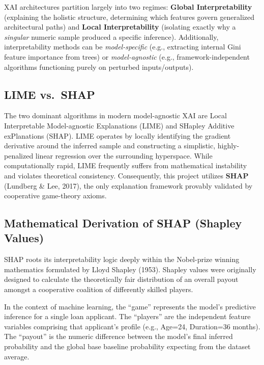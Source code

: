 XAI architectures partition largely into two regimes: \textbf{Global
Interpretability} (explaining the holistic structure, determining which
features govern generalized architectural paths) and \textbf{Local
Interpretability} (isolating exactly why a \emph{singular} numeric
sample produced a specific inference). Additionally, interpretability
methods can be \emph{model-specific} (e.g., extracting internal Gini
feature importance from trees) or \emph{model-agnostic} (e.g.,
framework-independent algorithms functioning purely on perturbed
inputs/outputs).

\hypertarget{lime-vs.-shap}{%
\subsection{LIME vs.~SHAP}\label{lime-vs.-shap}}

The two dominant algorithms in modern model-agnostic XAI are Local
Interpretable Model-agnostic Explanations (LIME) and SHapley Additive
exPlanations (SHAP). LIME operates by locally identifying the gradient
derivative around the inferred sample and constructing a simplistic,
highly-penalized linear regression over the surrounding hyperspace.
While computationally rapid, LIME frequently suffers from mathematical
instability and violates theoretical consistency. Consequently, this
project utilizes \textbf{SHAP} (Lundberg \& Lee, 2017), the only
explanation framework provably validated by cooperative game-theory
axioms.

\hypertarget{mathematical-derivation-of-shap-shapley-values}{%
\subsection{Mathematical Derivation of SHAP (Shapley
Values)}\label{mathematical-derivation-of-shap-shapley-values}}

SHAP roots its interpretability logic deeply within the Nobel-prize
winning mathematics formulated by Lloyd Shapley (1953). Shapley values
were originally designed to calculate the theoretically fair
distribution of an overall payout amongst a cooperative coalition of
differently skilled players.

In the context of machine learning, the ``game'' represents the model's
predictive inference for a single loan applicant. The ``players'' are
the independent feature variables comprising that applicant's profile
(e.g., Age=24, Duration=36 months). The ``payout'' is the numeric
difference between the model's final inferred probability and the global
base baseline probability expecting from the dataset average.

